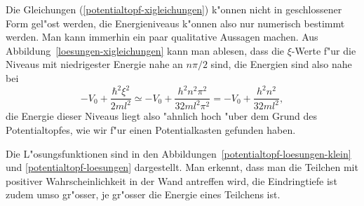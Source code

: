 Die Gleichungen (\ref{potentialtopf-xigleichungen}) k"onnen nicht 
in geschlossener Form gel"ost werden, die Energieniveaus k"onnen also
nur numerisch bestimmt werden.
Man kann immerhin ein paar qualitative Aussagen machen.
Aus Abbildung~\ref{loesungen-xigleichungen} kann man ablesen, dass die
$\xi$-Werte f"ur die Niveaus mit niedrigester Energie nahe an $n\pi/2$
sind, die Energien sind also nahe bei
\[
-V_0+\frac{\hbar^2\xi^2}{2ml^2}
\simeq
-V_0+\frac{h^2n^2\pi^2}{32ml^2\pi^2}
=
-V_0+\frac{h^2n^2}{32ml^2},
\]
die Energie dieser Niveaus liegt also "ahnlich hoch "uber dem Grund
des Potentialtopfes, wie wir f"ur einen Potentialkasten gefunden haben.

Die L"osungsfunktionen sind in den
Abbildungen~\ref{potentialtopf-loesungen-klein}
und \ref{potentialtopf-loesungen}
dargestellt.
Man erkennt, dass man die Teilchen mit positiver Wahrscheinlichkeit in
der Wand antreffen wird, die Eindringtiefe ist zudem umso gr"osser,
je gr"osser die Energie eines Teilchens ist.
